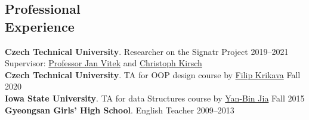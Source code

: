 \documentclass[margin,line]{resume}
\begin{document}
\begin{resume}
\section{\mysidestyle Professional\\Experience}
\textbf{Czech Technical University}.  Researcher on the Signatr Project \hfill 2019--2021\\
Supervisor: \href{http://janvitek.org/}{Professor Jan Vitek} and \href{http://cs.uni-salzburg.at/~ck/}{Christoph Kirsch}\\[\mysmallskip]
\textbf{Czech Technical University}.  {\small TA} for {\small OOP} design course by \href{https://fikovnik.net/}{Filip Krikava} \hfill Fall 2020\\[\mysmallskip]
\textbf{Iowa State University}.  {\small TA} for data Structures course by \href{http://web.cs.iastate.edu/~jia/}{Yan-Bin Jia} \hfill Fall 2015\\[\mysmallskip]
\textbf{Gyeongsan Girls' High School}. English Teacher  \hfill 2009--2013

    

    
    
    


\end{resume}
\end{document}

